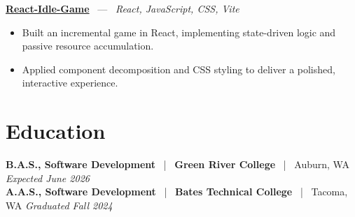 \documentclass[10pt, letterpaper]{article}
\newcommand{\jobhead}[4]{%
  \vspace{5pt}%
  {\bfseries\color{dark}#1}%
  ~{\color{light}|}~%
  {\bfseries\color{navy}#2}%
  ~{\color{light}|}~%
  {\color{light}#3}%
  \hfill{\color{light}\small\textit{#4}}\\[-2pt]%
}
\newcommand{\projhead}[3]{%
  \vspace{5pt}%
  {\bfseries\color{dark}\href{#2}{#1}}%
  ~{\color{light}---}~%
  {\color{light}\small\textit{#3}}\\[-2pt]%
}
\begin{document}
\projhead{React-Idle-Game}{https://github.com/timmyd4/React-Idle-Game}{React, JavaScript, CSS, Vite}
\begin{itemize}
  \item Built an incremental game in React, implementing state-driven logic and passive resource accumulation.
  \item Applied component decomposition and CSS styling to deliver a polished, interactive experience.
\end{itemize}

\section{Education}

\jobhead{B.A.S., Software Development}{Green River College}{Auburn, WA}{Expected June 2026}
\jobhead{A.A.S., Software Development}{Bates Technical College}{Tacoma, WA}{Graduated Fall 2024}
\end{document}

